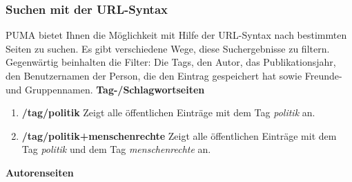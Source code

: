 \subsubsection{Suchen mit der URL-Syntax}
PUMA bietet Ihnen die Möglichkeit mit Hilfe der URL-Syntax nach bestimmten Seiten zu suchen. Es gibt verschiedene Wege, diese Suchergebnisse zu filtern. Gegenwärtig beinhalten die Filter: Die Tags, den Autor, das Publikationsjahr, den Benutzernamen der Person, die den Eintrag gespeichert hat sowie Freunde- und Gruppennamen. \newline
\newline
\textbf{Tag-/Schlagwortseiten}
\begin{enumerate}
    \item \textbf{/tag/politik} \newline
    Zeigt alle öffentlichen Einträge mit dem Tag \textit{politik} an.
    \item \textbf{/tag/politik+menschenrechte}\newline
    Zeigt alle öffentlichen Einträge mit dem Tag \textit{politik} und dem Tag \textit{menschenrechte} an.
\end{enumerate}
\textbf{Autorenseiten}
